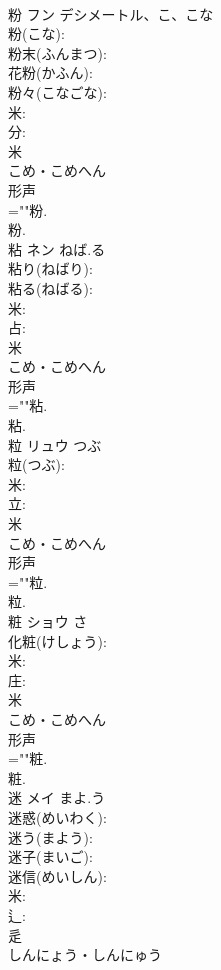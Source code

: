 \documentclass[8pt]{extreport}
\begin{document}
\begin{CJK}{UTF8}{min}
\\	粉	フン	デシメートル、こ、こな		
\\	粉(こな): 
\\	粉末(ふんまつ): 
\\	花粉(かふん): 
\\	粉々(こなごな): 
\\	米: 
\\	分: 
\\	米	
\\	こめ・こめへん	
\\	形声 
\\	=""粉.
\\	粉.
\\	粘	ネン	ねば.る		
\\	粘り(ねばり): 
\\	粘る(ねばる): 
\\	米: 
\\	占: 
\\	米	
\\	こめ・こめへん	
\\	形声 
\\	=""粘.
\\	粘.
\\	粒	リュウ	つぶ		
\\	粒(つぶ): 
\\	米: 
\\	立: 
\\	米	
\\	こめ・こめへん	
\\	形声 
\\	=""粒.
\\	粒.
\\	粧	ショウ		さ	
\\	化粧(けしょう): 
\\	米: 
\\	庄: 
\\	米	
\\	こめ・こめへん	
\\	形声 
\\	=""粧.
\\	粧.
\\	迷	メイ	まよ.う		
\\	迷惑(めいわく): 
\\	迷う(まよう): 
\\	迷子(まいご): 
\\	迷信(めいしん): 
\\	米: 
\\	辶: 
\\	辵	
\\	しんにょう・しんにゅう	

\end{CJK}
\end{document}
